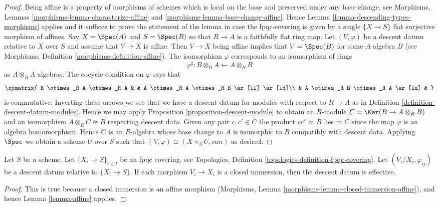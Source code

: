 \begin{proof}
Being affine is a property of morphisms of schemes
which is local on the base and preserved under any base change, see
Morphisms, Lemmas \ref{morphisms-lemma-characterize-affine} and
\ref{morphisms-lemma-base-change-affine}.
Hence Lemma \ref{lemma-descending-types-morphisms} applies
and it suffices to prove the statement of the lemma
in case the fpqc-covering is given by a single
$\{X \to S\}$ flat surjective morphism of affines.
Say $X = \Spec(A)$ and $S = \Spec(R)$ so
that $R \to A$ is a faithfully flat ring map.
Let $(V, \varphi)$ be a descent datum relative to $X$ over $S$
and assume that $V \to X$ is affine.
Then $V \to X$ being affine implies that $V = \Spec(B)$
for some $A$-algebra $B$ (see
Morphisms, Definition \ref{morphisms-definition-affine}).
The isomorphism $\varphi$ corresponds to an isomorphism
of rings
$$
\varphi^\sharp :
B \otimes_R A \longleftarrow A \otimes_R B
$$
as $A \otimes_R A$-algebras. The cocycle condition on $\varphi$
says that
$$
\xymatrix{
B \otimes_R A \otimes_R A & &
A \otimes_R A \otimes_R B \ar[ll] \ar[ld]\\
& A \otimes_R B \otimes_R A \ar[lu] &
}
$$
is commutative. Inverting these arrows we see that we have a
descent datum for modules with respect to $R \to A$ as in
Definition \ref{definition-descent-datum-modules}.
Hence we may apply Proposition \ref{proposition-descent-module}
to obtain an $R$-module
$C = \Ker(B \to A \otimes_R B)$
and an isomorphism $A \otimes_R C \cong B$
respecting descent data. Given any pair $c, c' \in C$
the product $cc'$ in $B$ lies in $C$ since the
map $\varphi$ is an algebra homomorphism. Hence
$C$ is an $R$-algebra whose base change to $A$ is
isomorphic to $B$ compatibly with descent data.
Applying $\Spec$ we obtain a scheme
$U$ over $S$ such that $(V, \varphi) \cong (X \times_S U, can)$
as desired.
\end{proof}

\begin{lemma}
\label{lemma-closed-immersion}
Let $S$ be a scheme.
Let $\{X_i \to S\}_{i\in I}$ be an fpqc covering, see
Topologies, Definition \ref{topologies-definition-fpqc-covering}.
Let $(V_i/X_i, \varphi_{ij})$ be a descent datum
relative to $\{X_i \to S\}$. If each morphism
$V_i \to X_i$ is a closed immersion, then the descent datum is
effective.
\end{lemma}

\begin{proof}
This is true because a closed immersion is an affine morphism
(Morphisms, Lemma \ref{morphisms-lemma-closed-immersion-affine}),
and hence Lemma \ref{lemma-affine} applies.
\end{proof}


